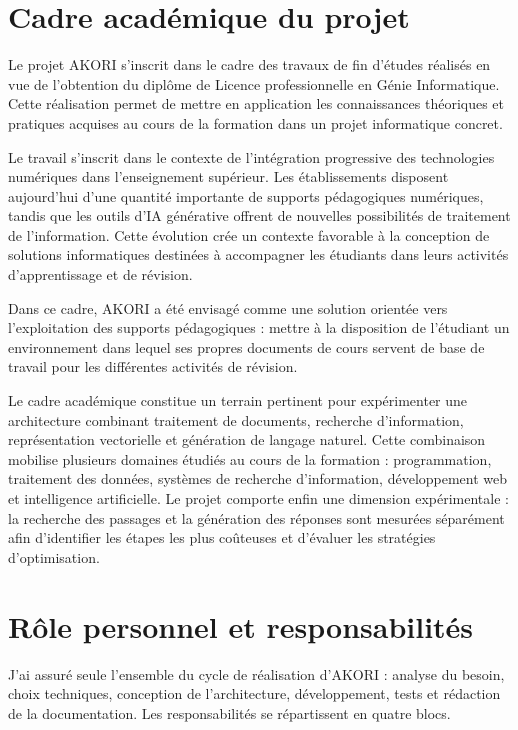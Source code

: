 \documentclass[12pt,a4paper,oneside]{report}
\begin{document}
\section{Cadre académique du projet}

Le projet AKORI s'inscrit dans le cadre des travaux de fin d'études réalisés en vue de l'obtention du diplôme de Licence professionnelle en Génie Informatique. Cette réalisation permet de mettre en application les connaissances théoriques et pratiques acquises au cours de la formation dans un projet informatique concret.

Le travail s'inscrit dans le contexte de l'intégration progressive des technologies numériques dans l'enseignement supérieur. Les établissements disposent aujourd'hui d'une quantité importante de supports pédagogiques numériques, tandis que les outils d'IA générative offrent de nouvelles possibilités de traitement de l'information. Cette évolution crée un contexte favorable à la conception de solutions informatiques destinées à accompagner les étudiants dans leurs activités d'apprentissage et de révision.

Dans ce cadre, AKORI a été envisagé comme une solution orientée vers l'exploitation des supports pédagogiques : mettre à la disposition de l'étudiant un environnement dans lequel ses propres documents de cours servent de base de travail pour les différentes activités de révision.

Le cadre académique constitue un terrain pertinent pour expérimenter une architecture combinant traitement de documents, recherche d'information, représentation vectorielle et génération de langage naturel. Cette combinaison mobilise plusieurs domaines étudiés au cours de la formation : programmation, traitement des données, systèmes de recherche d'information, développement web et intelligence artificielle. Le projet comporte enfin une dimension expérimentale : la recherche des passages et la génération des réponses sont mesurées séparément afin d'identifier les étapes les plus coûteuses et d'évaluer les stratégies d'optimisation.

\section{Rôle personnel et responsabilités}

J'ai assuré seule l'ensemble du cycle de réalisation d'AKORI : analyse du besoin, choix techniques, conception de l'architecture, développement, tests et rédaction de la documentation. Les responsabilités se répartissent en quatre blocs.
\end{document}
